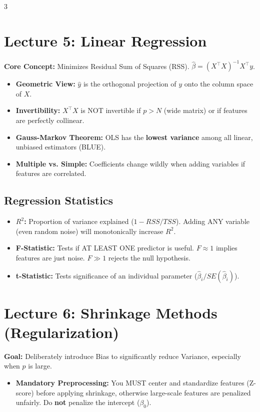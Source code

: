 \documentclass[10pt,landscape]{article}
\begin{document}
\begin{multicols*}{3}
\section*{Lecture 5: Linear Regression}
\textbf{Core Concept:} Minimizes Residual Sum of Squares (RSS). $\hat{\beta} = (X^\top X)^{-1}X^\top y$.
\begin{itemize}
    \item \textbf{Geometric View:} $\hat{y}$ is the orthogonal projection of $y$ onto the column space of $X$.
    \item \textbf{Invertibility:} $X^\top X$ is NOT invertible if $p > N$ (wide matrix) or if features are perfectly collinear.
    \item \textbf{Gauss-Markov Theorem:} OLS has the \textbf{lowest variance} among all linear, unbiased estimators (BLUE).
    \item \textbf{Multiple vs. Simple:} Coefficients change wildly when adding variables if features are correlated.
\end{itemize}

\subsection*{Regression Statistics}
\begin{itemize}
    \item \textbf{$R^2$:} Proportion of variance explained ($1 - RSS/TSS$). Adding ANY variable (even random noise) will monotonically increase $R^2$.
    \item \textbf{F-Statistic:} Tests if AT LEAST ONE predictor is useful. $F \approx 1$ implies features are just noise. $F \gg 1$ rejects the null hypothesis.
    \item \textbf{t-Statistic:} Tests significance of an individual parameter ($\hat{\beta}_i / SE(\hat{\beta}_i)$).
\end{itemize}

\section*{Lecture 6: Shrinkage Methods (Regularization)}
\textbf{Goal:} Deliberately introduce Bias to significantly reduce Variance, especially when $p$ is large.
\begin{itemize}
    \item \textbf{Mandatory Preprocessing:} You MUST center and standardize features (Z-score) before applying shrinkage, otherwise large-scale features are penalized unfairly. Do \textbf{not} penalize the intercept ($\beta_0$).
\end{itemize}


\end{multicols*}
\end{document}
